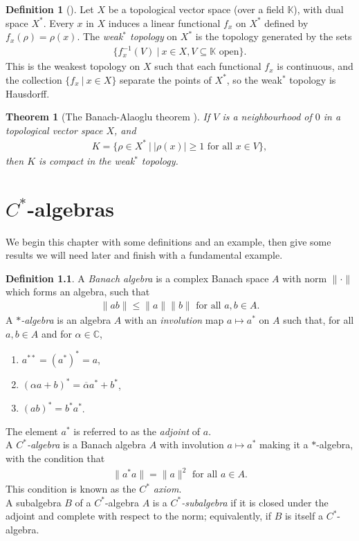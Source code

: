\documentclass[12pt,a4paper]{report}
\theoremstyle{plain}
\newtheorem*{thm*}{Theorem}
\theoremstyle{definition}
\newtheorem{defn}{Definition}
\newtheorem*{defn*}{Definition}
\newcommand{\1}{\mathbbm{1}}
\newcommand{\C}{\mathbb{C}}
\begin{document}
\begin{defn*}[{\cite[3.14]{rudin91}}]
	Let $X$ be a topological vector space (over a field $\mathbb K$), with dual space $X^\ast$. Every 
	$x$ in $X$ induces a linear functional $f_x$ on $X^\ast$ defined by $f_x(\rho)=\rho(x)$. The 
	\emph{weak$^\ast$ topology} on $X^\ast$ is the topology generated by the sets 
	\begin{align*}
		\{f^{-1}_x(V) ~|~ x \in X, V\subseteq \mathbb K \mbox{ open}\}.
	\end{align*}
	This is the weakest topology on $X$ such that each functional $f_x$ is continuous, and the 
	collection $\{f_x ~|~ x\in X\}$ separate the points of $X^\ast$, so the weak$^\ast$ topology is 
	Hausdorff.
\end{defn*}
\begin{thm*}[{The Banach-Alaoglu theorem \cite{rudin91}}]
	If $V$ is a neighbourhood of $0$ in a topological vector space $X$, and
	\begin{align*}
		K=\{\rho\in X^\ast ~|~ |\rho(x)|\geq 1 \mbox{ for all } x \in V \},
	\end{align*}
	then $K$ is compact in the weak$^\ast$ topology.
\end{thm*}

\chapter{$C^\ast$-algebras}
We begin this chapter with some definitions and an example, then give some results we 
will need later and finish with a fundamental example.
\begin{defn}
	A \emph{Banach algebra} is a complex Banach space $A$ with norm $\|\cdot\|$ which forms an 
	algebra, such that 
	\begin{align*}
		\|ab\| \leq \|a\| \|b\| \mbox{ for all } a,b \in A.
	\end{align*}
	A \emph{$\ast$-algebra} is an algebra $A$ with an \emph{involution} map 
	$a \mapsto a^\ast$ on $A$ such that, for all $a,b \in A$ and for $\alpha \in \C$,
	
	\begin{enumerate}
		\item $a^{\ast\ast} = (a^\ast)^\ast = a$,
		\item $(\alpha a+b)^\ast = \overline{\alpha} a^\ast + b^\ast$,
		\item $(ab)^\ast = b^\ast a^\ast$.
	\end{enumerate}
	The element $a^\ast$ is referred to as the \emph{adjoint} of $a$. 		\\
	A \emph{$C^\ast$-algebra} is a Banach algebra $A$ with involution $a \mapsto a^\ast$ making it a 
	$\ast$-algebra, with the condition that
	\begin{align*}
		\|a ^\ast a\| = \|a\|^2 \mbox{ for all } a \in A.
	\end{align*}
	This condition is known as the \emph{$C^\ast$ axiom}.\\
	A subalgebra $B$ of a $C^\ast$-algebra $A$ is a \emph{$C^\ast$-subalgebra} if it is closed under the 
	adjoint and complete with respect to the norm; equivalently, if $B$ is itself a $C^\ast$-algebra.
\end{defn}
\end{document}
